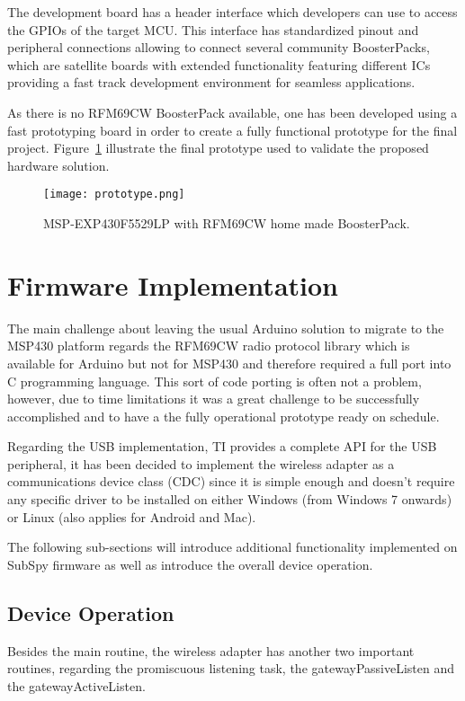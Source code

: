 \documentclass[12pt]{article}
\begin{document}
The development board has a header interface which developers can use to access the GPIOs of the target MCU. This interface has standardized pinout and peripheral connections allowing to connect several community BoosterPacks, which are satellite boards with extended functionality featuring different ICs providing a fast track development environment for seamless applications.

As there is no RFM69CW BoosterPack available, one has been developed using a fast prototyping board in order to create a fully functional prototype for the final project. Figure~\ref{fig:prototype} illustrate the final prototype used to validate the proposed hardware solution.

\begin{figure}[H]
    \centering
    \texttt{[image: prototype.png]}
    \caption{MSP-EXP430F5529LP with RFM69CW home made BoosterPack.}
    \label{fig:prototype}
\end{figure}


\newpage
\section{Firmware Implementation}
\label{firmwareImplementation}
The main challenge about leaving the usual Arduino solution to migrate to the MSP430 platform regards the RFM69CW radio protocol library which is available for Arduino but not for MSP430 and therefore required a full port into C programming language. This sort of code porting is often not a problem, however, due to time limitations it was a great challenge to be successfully accomplished and to have a the fully operational prototype ready on schedule.

Regarding the USB implementation, TI provides a complete API for the USB peripheral, it has been decided to implement the wireless adapter as a communications device class (CDC) since it is simple enough and doesn't require any specific driver to be installed on either Windows (from Windows 7 onwards) or Linux (also applies for Android and Mac).

The following sub-sections will introduce additional functionality implemented on SubSpy firmware as well as introduce the overall device operation.


\subsection{Device Operation}
Besides the main routine, the wireless adapter has another two important routines, regarding the promiscuous listening task, the gatewayPassiveListen and the gatewayActiveListen.
\end{document}
